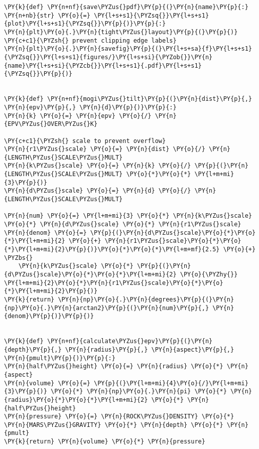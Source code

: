 \begin{tcolorbox}[breakable, size=fbox, boxrule=1pt, pad at break*=1mm,colback=cellbackground, colframe=cellborder]
\begin{Verbatim}[commandchars=\\\{\}]
\PY{k}{def} \PY{n+nf}{save\PYZus{}pdf}\PY{p}{(}\PY{n}{name}\PY{p}{:} \PY{n+nb}{str} \PY{o}{=} \PY{l+s+s1}{\PYZsq{}}\PY{l+s+s1}{plot}\PY{l+s+s1}{\PYZsq{}}\PY{p}{)}\PY{p}{:}
\PY{n}{plt}\PY{o}{.}\PY{n}{tight\PYZus{}layout}\PY{p}{(}\PY{p}{)}  \PY{c+c1}{\PYZsh{} prevent clipping edge labels}
\PY{n}{plt}\PY{o}{.}\PY{n}{savefig}\PY{p}{(}\PY{l+s+sa}{f}\PY{l+s+s1}{\PYZsq{}}\PY{l+s+s1}{figures/}\PY{l+s+si}{\PYZob{}}\PY{n}{name}\PY{l+s+si}{\PYZcb{}}\PY{l+s+s1}{.pdf}\PY{l+s+s1}{\PYZsq{}}\PY{p}{)}


\PY{k}{def} \PY{n+nf}{mogi\PYZus{}tilt}\PY{p}{(}\PY{n}{dist}\PY{p}{,} \PY{n}{epv}\PY{p}{,} \PY{n}{d}\PY{p}{)}\PY{p}{:}
\PY{n}{k} \PY{o}{=} \PY{n}{epv} \PY{o}{/} \PY{n}{EPV\PYZus{}OVER\PYZus{}K}

\PY{c+c1}{\PYZsh{} scale to prevent overflow}
\PY{n}{r1\PYZus{}scale} \PY{o}{=} \PY{n}{dist} \PY{o}{/} \PY{n}{LENGTH\PYZus{}SCALE\PYZus{}MULT}
\PY{n}{k\PYZus{}scale} \PY{o}{=} \PY{n}{k} \PY{o}{/} \PY{p}{(}\PY{n}{LENGTH\PYZus{}SCALE\PYZus{}MULT} \PY{o}{*}\PY{o}{*} \PY{l+m+mi}{3}\PY{p}{)}
\PY{n}{d\PYZus{}scale} \PY{o}{=} \PY{n}{d} \PY{o}{/} \PY{n}{LENGTH\PYZus{}SCALE\PYZus{}MULT}

\PY{n}{num} \PY{o}{=} \PY{l+m+mi}{3} \PY{o}{*} \PY{n}{k\PYZus{}scale} \PY{o}{*} \PY{n}{d\PYZus{}scale} \PY{o}{*} \PY{n}{r1\PYZus{}scale}
\PY{n}{denom} \PY{o}{=} \PY{p}{(}\PY{n}{d\PYZus{}scale}\PY{o}{*}\PY{o}{*}\PY{l+m+mi}{2} \PY{o}{+} \PY{n}{r1\PYZus{}scale}\PY{o}{*}\PY{o}{*}\PY{l+m+mi}{2}\PY{p}{)}\PY{o}{*}\PY{o}{*}\PY{l+m+mf}{2.5} \PY{o}{+} \PYZbs{}
    \PY{n}{k\PYZus{}scale} \PY{o}{*} \PY{p}{(}\PY{n}{d\PYZus{}scale}\PY{o}{*}\PY{o}{*}\PY{l+m+mi}{2} \PY{o}{\PYZhy{}} \PY{l+m+mi}{2}\PY{o}{*}\PY{n}{r1\PYZus{}scale}\PY{o}{*}\PY{o}{*}\PY{l+m+mi}{2}\PY{p}{)}
\PY{k}{return} \PY{n}{np}\PY{o}{.}\PY{n}{degrees}\PY{p}{(}\PY{n}{np}\PY{o}{.}\PY{n}{arctan2}\PY{p}{(}\PY{n}{num}\PY{p}{,} \PY{n}{denom}\PY{p}{)}\PY{p}{)}


\PY{k}{def} \PY{n+nf}{calculate\PYZus{}epv}\PY{p}{(}\PY{n}{depth}\PY{p}{,} \PY{n}{radius}\PY{p}{,} \PY{n}{aspect}\PY{p}{,} \PY{n}{pmult}\PY{p}{)}\PY{p}{:}
\PY{n}{half\PYZus{}height} \PY{o}{=} \PY{n}{radius} \PY{o}{*} \PY{n}{aspect}
\PY{n}{volume} \PY{o}{=} \PY{p}{(}\PY{l+m+mi}{4}\PY{o}{/}\PY{l+m+mi}{3}\PY{p}{)} \PY{o}{*} \PY{n}{np}\PY{o}{.}\PY{n}{pi} \PY{o}{*} \PY{n}{radius}\PY{o}{*}\PY{o}{*}\PY{l+m+mi}{2} \PY{o}{*} \PY{n}{half\PYZus{}height}
\PY{n}{pressure} \PY{o}{=} \PY{n}{ROCK\PYZus{}DENSITY} \PY{o}{*} \PY{n}{MARS\PYZus{}GRAVITY} \PY{o}{*} \PY{n}{depth} \PY{o}{*} \PY{n}{pmult}
\PY{k}{return} \PY{n}{volume} \PY{o}{*} \PY{n}{pressure}



\end{Verbatim}
\end{tcolorbox}
